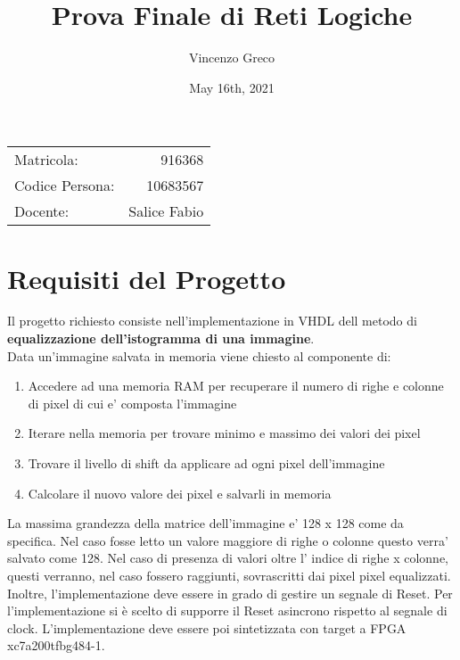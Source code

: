 \documentclass{article}
\title{Prova Finale di Reti Logiche} %
\author{Vincenzo Greco} %
\date{May 16th, 2021}
\begin{document}
\maketitle %
\begin{center}
\begin{tabular}{l r}
Matricola: & 916368\\ %
Codice Persona: & 10683567\\
Docente: & Salice Fabio	 %
\end{tabular}
\end{center}

\section{Requisiti del Progetto}

Il progetto richiesto consiste nell'implementazione in VHDL dell metodo di \textbf{
equalizzazione dell’istogramma di una immagine}.\\
Data un'immagine salvata in memoria viene chiesto al componente di:
\begin{enumerate}
\item Accedere ad una memoria RAM per recuperare il numero di righe e colonne di pixel di cui e' composta l'immagine
\item Iterare nella memoria per trovare minimo e massimo dei valori dei pixel
\item Trovare il livello di shift da applicare ad ogni pixel dell'immagine
\item Calcolare il nuovo valore dei pixel e salvarli in memoria
\end{enumerate}

La massima grandezza della matrice dell'immagine e' 128 x 128 come da specifica. Nel caso fosse letto un valore maggiore di righe o colonne questo verra' salvato come 128. Nel caso di presenza di valori oltre l' indice di righe x colonne, questi verranno, nel caso fossero raggiunti, sovrascritti dai pixel pixel equalizzati.\\
Inoltre, l'implementazione deve essere in grado di gestire un segnale di Reset. Per l'implementazione si è scelto di supporre il Reset asincrono rispetto al segnale di clock. L'implementazione deve essere poi sintetizzata con target a FPGA xc7a200tfbg484-1.

\newpage
\noindent

\end{document}
